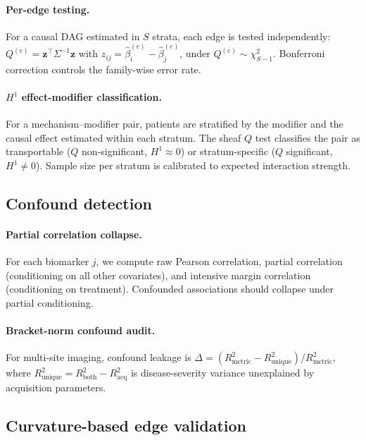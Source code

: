 \documentclass[11pt]{article}
\begin{document}
\paragraph{Per-edge testing.}
For a causal DAG estimated in $S$ strata, each edge is tested independently:
$Q^{(e)} = \mathbf{z}^\top \Sigma^{-1} \mathbf{z}$ with $z_{ij} = \hat\beta_i^{(e)} - \hat\beta_j^{(e)}$, under $Q^{(e)} \sim \chi^2_{S-1}$.
Bonferroni correction controls the family-wise error rate.

\paragraph{$H^1$ effect-modifier classification.}
For a mechanism--modifier pair, patients are stratified by the modifier and the causal effect estimated within each stratum.
The sheaf $Q$ test classifies the pair as transportable ($Q$ non-significant, $H^1 \approx 0$) or stratum-specific ($Q$ significant, $H^1 \neq 0$).
Sample size per stratum is calibrated to expected interaction strength.

\subsection{Confound detection}
\label{sec:meth-confound}

\paragraph{Partial correlation collapse.}
For each biomarker $j$, we compute raw Pearson correlation, partial correlation (conditioning on all other covariates), and intensive margin correlation (conditioning on treatment).
Confounded associations should collapse under partial conditioning.

\paragraph{Bracket-norm confound audit.}
For multi-site imaging, confound leakage is $\Delta = (R^2_{\mathrm{metric}} - R^2_{\mathrm{unique}}) / R^2_{\mathrm{metric}}$, where $R^2_{\mathrm{unique}} = R^2_{\mathrm{both}} - R^2_{\mathrm{acq}}$ is disease-severity variance unexplained by acquisition parameters.

\subsection{Curvature-based edge validation}
\label{sec:meth-curvature}
\end{document}
